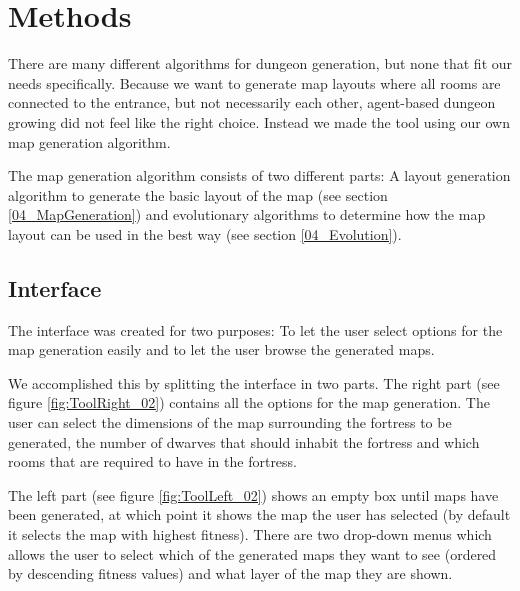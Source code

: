 \section{Methods}
\label{04}
There are many different algorithms for dungeon generation\cite[Chapter 3]{PCGBook}, but none that fit our needs specifically. Because we want to generate map layouts where all rooms are connected to the entrance, but not necessarily each other, agent-based dungeon growing did not feel like the right choice. Instead we made the tool using our own map generation algorithm.

The map generation algorithm consists of two different parts: A layout generation algorithm to generate the basic layout of the map (see section \ref{04_MapGeneration}) and evolutionary algorithms\cite[Chapter 2]{IoEC} to determine how the map layout can be used in the best way (see section \ref{04_Evolution}).

\subsection{Interface}
\label{04_Interface}
The interface was created for two purposes: To let the user select options for the map generation easily and to let the user browse the generated maps. 

We accomplished this by splitting the interface in two parts. The right part (see figure \ref{fig:ToolRight_02}) contains all the options for the map generation. The user can select the dimensions of the map surrounding the fortress to be generated, the number of dwarves that should inhabit the fortress and which rooms that are required to have in the fortress.

The left part (see figure \ref{fig:ToolLeft_02}) shows an empty box until maps have been generated, at which point it shows the map the user has selected (by default it selects the map with highest fitness). There are two drop-down menus which allows the user to select which of the generated maps they want to see (ordered by descending fitness values) and what layer of the map they are shown.



